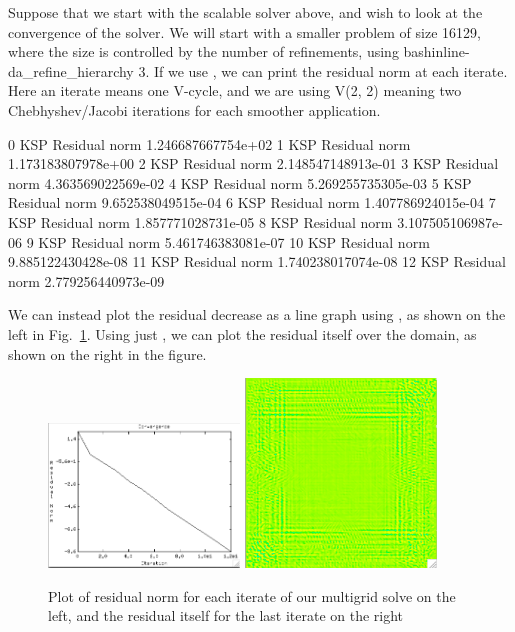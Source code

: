 Suppose that we start with the scalable solver above, and wish to look at the convergence of the solver. We will start with a smaller problem of size 16129, where the size is controlled by the number of refinements, using bashinline{-da\_refine\_hierarchy 3}. If we use , we can print the residual norm at each iterate. Here an iterate means one V-cycle, and we are using V(2, 2) meaning two Chebhyshev/Jacobi iterations for each smoother application.
\begin{bash}
0 KSP Residual norm 1.246687667754e+02
1 KSP Residual norm 1.173183807978e+00
2 KSP Residual norm 2.148547148913e-01
3 KSP Residual norm 4.363569022569e-02
4 KSP Residual norm 5.269255735305e-03
5 KSP Residual norm 9.652538049515e-04
6 KSP Residual norm 1.407786924015e-04
7 KSP Residual norm 1.857771028731e-05
8 KSP Residual norm 3.107505106987e-06
9 KSP Residual norm 5.461746383081e-07
10 KSP Residual norm 9.885122430428e-08
11 KSP Residual norm 1.740238017074e-08
12 KSP Residual norm 2.779256440973e-09
\end{bash}
We can instead plot the residual decrease as a line graph using , as shown on the left in Fig.~\ref{fig:residualPlots}. Using just , we can plot the residual itself over the domain, as shown on the right in the figure.

\begin{figure}
\centering
\includegraphics[width=2in]{figures/residualLG.png}\hfil
\includegraphics[width=2in]{figures/residualLast.png}
\caption{Plot of residual norm for each iterate of our multigrid solve on the left, and the residual itself for the last iterate on the right\label{fig:residualPlots}}
\end{figure}

